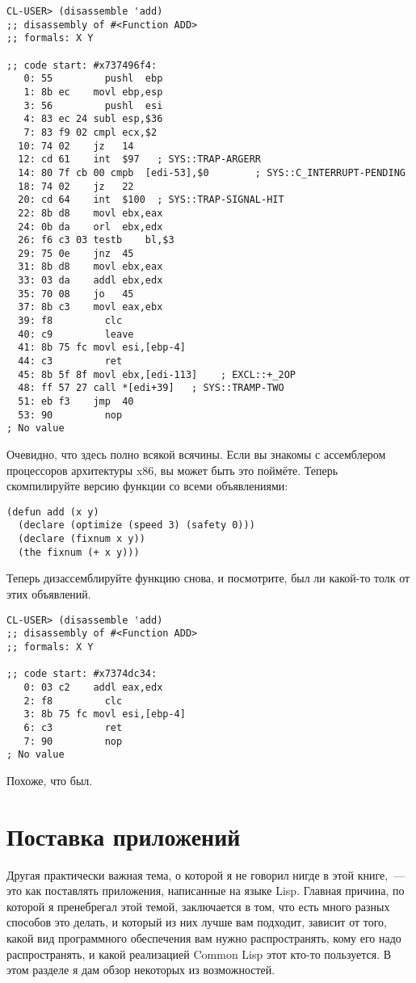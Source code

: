 \begin{lstlisting}
CL-USER> (disassemble 'add)
;; disassembly of #<Function ADD>
;; formals: X Y

;; code start: #x737496f4:
   0: 55         pushl	ebp
   1: 8b ec    movl	ebp,esp
   3: 56         pushl	esi
   4: 83 ec 24 subl	esp,$36
   7: 83 f9 02 cmpl	ecx,$2
  10: 74 02    jz	14
  12: cd 61    int	$97   ; SYS::TRAP-ARGERR
  14: 80 7f cb 00 cmpb	[edi-53],$0        ; SYS::C_INTERRUPT-PENDING
  18: 74 02    jz	22
  20: cd 64    int	$100  ; SYS::TRAP-SIGNAL-HIT
  22: 8b d8    movl	ebx,eax
  24: 0b da    orl	ebx,edx
  26: f6 c3 03 testb	bl,$3
  29: 75 0e    jnz	45
  31: 8b d8    movl	ebx,eax
  33: 03 da    addl	ebx,edx
  35: 70 08    jo	45
  37: 8b c3    movl	eax,ebx
  39: f8         clc
  40: c9         leave
  41: 8b 75 fc movl	esi,[ebp-4]
  44: c3         ret
  45: 8b 5f 8f movl	ebx,[edi-113]    ; EXCL::+_2OP
  48: ff 57 27 call	*[edi+39]   ; SYS::TRAMP-TWO
  51: eb f3    jmp	40
  53: 90         nop
; No value
\end{lstlisting}

Очевидно, что здесь полно всякой всячины. Если вы знакомы с ассемблером процессоров
архитектуры x86, вы может быть это поймёте. Теперь скомпилируйте версию функции 
со всеми объявлениями:

\begin{lstlisting}
(defun add (x y)
  (declare (optimize (speed 3) (safety 0)))
  (declare (fixnum x y))
  (the fixnum (+ x y)))
\end{lstlisting}

Теперь дизассемблируйте функцию  снова, и посмотрите, был ли какой-то толк от
этих объявлений.

\begin{lstlisting}
CL-USER> (disassemble 'add)
;; disassembly of #<Function ADD>
;; formals: X Y

;; code start: #x7374dc34:
   0: 03 c2    addl	eax,edx
   2: f8         clc
   3: 8b 75 fc movl	esi,[ebp-4]
   6: c3         ret
   7: 90         nop
; No value
\end{lstlisting}

Похоже, что был.

\section{Поставка приложений}

Другая практически важная тема, о которой я не говорил нигде в этой книге,~--- это как
поставлять приложения, написанные на языке Lisp. Главная причина, по которой я пренебрегал
этой темой, заключается в том, что есть много разных способов это делать, и который из них
лучше вам подходит, зависит от того, какой вид программного обеспечения вам нужно
распространять, кому его надо распространять, и какой реализацией Common Lisp этот кто-то
пользуется. В этом разделе я дам обзор некоторых из возможностей.

